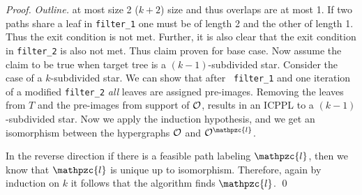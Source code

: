 \documentclass[11pt,
               envcountsect,
               envcountsame]
               {../lib/llncs2e/llncs}
\def\cF{{\cal F}}
\def\cO{{\cal O}}
\def\bO{\mathbb O}
\def\cl{\mathpzc{l}}
\def\lndisplay{1}
\begin{document}
\begin{proof} {\em Outline.}
  at most size 2 ($k+2$) size and thus overlaps are at most 1. If two
  paths share a leaf in {\tt filter\_1} one must be of length 2 and
  the other of length 1. Thus the exit condition is not met. Further,
  it is also clear that the exit condition in {\tt filter\_2} is also
  not met. Thus claim proven for base case.  Now assume the claim to
  be true when target tree is a $(k-1)$-subdivided star. Consider the
  case of a $k$-subdivided star.  We can show that after {\tt
    filter\_1} and one iteration of a modified {\tt filter\_2} {\em
    all} leaves are assigned pre-images.  Removing the leaves from $T$
  and the pre-images from support of $\cO$, results in an ICPPL to a
  $(k-1)$-subdivided star.  Now we apply the induction hypothesis, and
  we get an isomorphism between the hypergraphs $\cO$ and $\cO^\cl$.

  \noindent
  In the reverse direction if there is a feasible path labeling $\cl$,
  then we know that $\cl$ is unique up to isomorphism.  Therefore,
  again by induction on $k$ it follows that the algorithm finds $\cl$.
  \qed
\end{proof}


%
%



\end{document}
